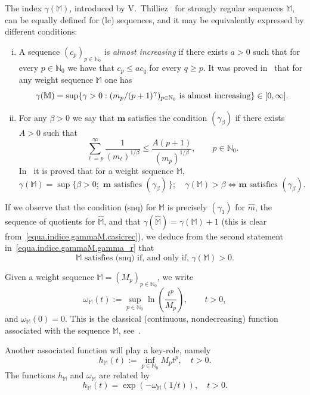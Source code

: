 \documentclass[11pt,a4paper]{article}
\theoremstyle{plain}
\theoremstyle{definition}
\newcommand{\N}{\mathbb{N}}
\newcommand{\be}{\beta}
\newcommand{\bM}{\mathbb{M}}
\newcommand{\M}{\mathbb{M}}
\newcommand{\hM}{\widehat{\M}}
\newcommand{\m}{\boldsymbol{m}}
\def\o{\omega}
\def\ga{\gamma}
\begin{document}
The index $\gamma(\M)$, introduced by V.~Thilliez~\cite[Sect.\ 1.3]{Thilliez03} for strongly regular sequences $\M$, can be equally defined for (lc) sequences, and it may be equivalently expressed by different conditions:
\begin{enumerate}[(i)]
\item A sequence $(c_p)_{p\in\N_0}$ is \emph{almost increasing} if there exists $a>0$ such that for every $p\in\N_0$ we have that $c_p\leq a c_q $ for every $ q\geq p$.
It was proved in~\cite{JimenezSanzSRSPO,JimenezSanzSchindlIndex} that for any weight sequence $\M$ one has
\begin{equation}\label{equa.indice.gammaM.casicrec}
\gamma(\bM)=\sup\{\gamma>0:(m_{p}/(p+1)^\gamma)_{p\in\N_0}\hbox{ is almost increasing} \}\in[0,\infty].
\end{equation}
\item For any $\be>0$ we say that $\m$ satisfies the condition $(\gamma_{\be})$ if there exists $A>0$ such that
\begin{equation*}%
\sum^\infty_{\ell=p} \frac{1}{(m_\ell)^{1/\be}}\leq \frac{A (p+1) }{(m_p)^{1/\be}},  \qquad p\in\N_0.\tag{$\gamma_\be$}
\end{equation*}
In~\cite{PhDJimenez,JimenezSanzSchindlIndex} it is proved that for a weight sequence $\M$,
\begin{equation}\label{equa.indice.gammaM.gamma_r}
\gamma(\M)=\sup\{\be>0; \,\, \m \,\, \text{satisfies } (\gamma_{\be})\,\};\quad \gamma(\M)>\be\iff\m\text{ satisfies }(\gamma_\be).
\end{equation}
\end{enumerate}


If we observe that the condition (snq) for $\M$ is precisely $(\gamma_1)$ for $\widehat{m}$, the sequence of quotients for $\hM$, and that $\ga(\hM)=\ga(\M)+1$ (this is clear from~\eqref{equa.indice.gammaM.casicrec}), we deduce from the second statement in~\eqref{equa.indice.gammaM.gamma_r} that
\begin{equation}\label{eq.snqiffgammaMpositive}
\textrm{$\M$ satisfies (snq) if, and only if, }\ga(\M)>0.
\end{equation}


Given a weight sequence $\M=(M_p)_{p\in\N_0}$, we write
$$\o_{\M}(t):=\sup_{p\in\N_0} \ln\left(\frac{t^{p}}{M_{p}}\right),\qquad t>0,$$
and $\o_{\M}(0)=0$. This is the classical
(continuous, nondecreasing)
function  associated with the sequence $\M$, see~\cite{komatsu}.

Another associated function will play a key-role, namely
\begin{equation*}%
h_\M(t):=\inf_{p\in\N_0}M_p t^p, \quad t>0.
\end{equation*}
The functions $h_\M$ and $\omega_\M$ are related by
\begin{equation}\label{functionhequ2}
h_\M(t)=\exp(-\omega_\M(1/t)),\quad t>0.
\end{equation}
\end{document}
